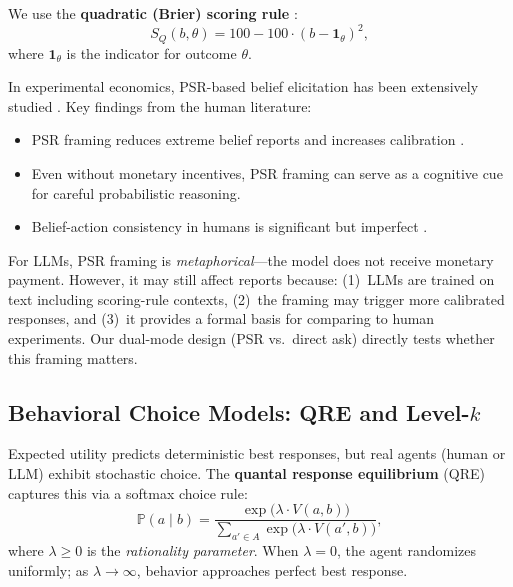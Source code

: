 \documentclass[12pt]{article}
\newcommand{\Prob}{\mathbb{P}}
\begin{document}
We use the \textbf{quadratic (Brier) scoring rule} \citep{brier1950verification}:
\begin{equation}
    S_Q(b, \theta) = 100 - 100 \cdot (b - \mathbf{1}_{\theta})^2,
    \label{eq:brier}
\end{equation}
where $\mathbf{1}_{\theta}$ is the indicator for outcome $\theta$.

In experimental economics, PSR-based belief elicitation has been extensively studied \citep{schotter2014belief, manski2004measuring}. Key findings from the human literature:
\begin{itemize}[nosep]
    \item PSR framing reduces extreme belief reports and increases calibration \citep{schotter2014belief}.
    \item Even without monetary incentives, PSR framing can serve as a cognitive cue for careful probabilistic reasoning.
    \item Belief-action consistency in humans is significant but imperfect \citep{nyarko2002experimental, costa2006cognition}.
\end{itemize}

For LLMs, PSR framing is \emph{metaphorical}---the model does not receive monetary payment. However, it may still affect reports because: (1)~LLMs are trained on text including scoring-rule contexts, (2)~the framing may trigger more calibrated responses, and (3)~it provides a formal basis for comparing to human experiments. Our dual-mode design (PSR vs.\ direct ask) directly tests whether this framing matters.


\subsection{Behavioral Choice Models: QRE and Level-$k$}
\label{sec:qre}

Expected utility predicts deterministic best responses, but real agents (human or LLM) exhibit stochastic choice. The \textbf{quantal response equilibrium} (QRE) \citep{mckelvey1995quantal} captures this via a softmax choice rule:
\begin{equation}
    \Prob(a \mid b) = \frac{\exp\big(\lambda \cdot V(a, b)\big)}{\sum_{a' \in A} \exp\big(\lambda \cdot V(a', b)\big)},
    \label{eq:qre}
\end{equation}
where $\lambda \geq 0$ is the \emph{rationality parameter}. When $\lambda = 0$, the agent randomizes uniformly; as $\lambda \to \infty$, behavior approaches perfect best response.
\end{document}
